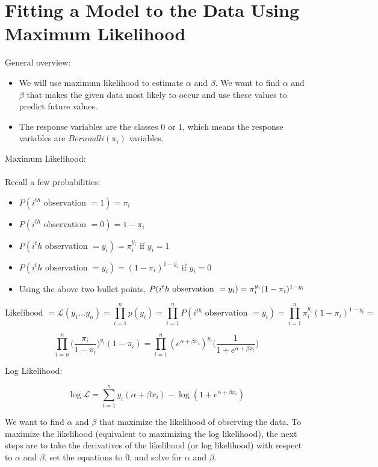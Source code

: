 \documentclass{article}
\begin{document}
\section{Fitting a Model to the Data Using Maximum Likelihood}
General overview:
\begin{itemize}
    \item We will use maximum likelihood to estimate $\alpha$ and $\beta$. We want to find $\alpha$ and $\beta$ that makes the given data most likely to occur and use these values to predict future values.
    \item The response variables are the classes $0$ or $1$, which means the response variables are $Bernoulli(\pi_i)$ variables.
\end{itemize}

\noindent Maximum Likelihood:
\\
\\
Recall a few probabilities:
\begin{itemize}
    \item $P(i^{th} \text{ observation } = 1) = \pi_i$
    \item $P(i^{th} \text{ observation } = 0) = 1 - \pi_i$
    \item $P(i^th \text{ observation } = y_i) = \pi_i^{y_i}$ if $y_i = 1$
    \item $P(i^th \text{ observation } = y_i) = (1-\pi_i)^{1-y_i}$ if $y_i = 0$
    \item Using the above two bullet points, $P(i^th \text{ observation } = y_i) =\\ \pi_i^{y_i}(1-\pi_i)^{1-y_i}$
\end{itemize}

$$
\text{Likelihood } = \mathscr{L}(y_1 \ldots y_n) = \prod_{i=1}^{n} p(y_i) = \prod_{i=1}^n P(i^{th} \text{ observation } = y_i) = \prod_{i=1}^n \pi_i^{y_i}(1-\pi_i)^{1-y_i} = 
$$

$$\prod_{i=n}^n \big(\dfrac{\pi_i}{1-\pi_i}\big)^{y_i}(1-\pi_i) = \prod_{i=1}^n (e^{\alpha + \beta x_i})^{y_i}\big(\dfrac{1}{1 + e^{\alpha + \beta x_i}}\big)$$

\noindent Log Likelihood:

$$\log \mathscr{L} = \sum_{i=1}^n y_i(\alpha + \beta x_i) - \log(1 + e^{\alpha + \beta x_i})$$

\noindent We want to find $\alpha$ and $\beta$ that maximize the likelihood of observing the data. To maximize the likelihood (equivalent to maximizing the log likelihood), the next steps are to take the derivatives of the likelihood (or log likelihood) with respect to $\alpha$ and $\beta$, set the equations to $0$, and solve for $\alpha$ and $\beta$.\\\\
\end{document}
